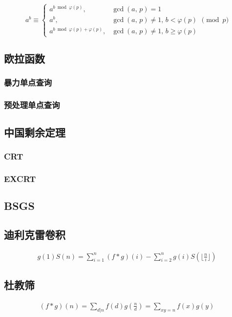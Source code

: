 \documentclass{article}
\begin{document}
$$
a^b\equiv
\begin{cases}
a^{b\bmod\varphi(p)},\,&\gcd(a,\,p)=1\\
a^b,&\gcd(a,\,p)\ne1,\,b<\varphi(p)\\
a^{b\bmod\varphi(p)+\varphi(p)},&\gcd(a,\,p)\ne1,\,b\ge\varphi(p)
\end{cases}
\pmod p
$$

\subsection{欧拉函数}
\subsubsection{暴力单点查询}

\subsubsection{预处理单点查询}

\subsection{中国剩余定理}
\subsubsection{CRT}

\subsubsection{EXCRT}

\subsection{BSGS}
\subsection{迪利克雷卷积}

$$
\begin{aligned}
g(1)S(n)=\sum_{i=1}^n(f*g)(i)-\sum_{i=2}^ng(i)S(\lfloor\frac{n}{i}\rfloor)
\end{aligned}
$$

\subsection{杜教筛}

$$
\begin{aligned}
(f*g)(n)=\underset{d|n}{\sum} f(d)g(\frac{n}{d})=\underset{xy=n}{\sum} f(x)g(y)
\end{aligned}
$$
\end{document}
